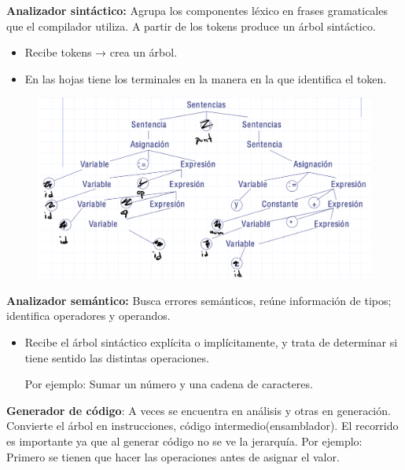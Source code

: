\documentclass[12pt]{report} %
\begin{document}
\textbf{Analizador sintáctico:} Agrupa los componentes léxico en frases
gramaticales que el compilador utiliza. A partir de los tokens produce
un árbol sintáctico.

\begin{itemize}
\item
  Recibe tokens → crea un árbol.
\item
  En las hojas tiene los terminales en la manera en la que identifica el
  token.
\end{itemize}

\begin{figure}[H]
	{\includegraphics[scale=.25]{Untitled 13.png}}
\end{figure}

\textbf{Analizador semántico:} Busca errores semánticos, reúne
información de tipos; identifica operadores y operandos.

\begin{itemize}
\item
  Recibe el árbol sintáctico explícita o implícitamente, y trata de
  determinar si tiene sentido las distintas operaciones.

  Por ejemplo: Sumar un número y una cadena de caracteres.
\end{itemize}

\textbf{Generador de código}: A veces se encuentra en análisis y otras
en generación. Convierte el árbol en instrucciones, código
intermedio(ensamblador). El recorrido es importante ya que al generar
código no se ve la jerarquía. Por ejemplo: Primero se tienen que hacer
las operaciones antes de asignar el valor.
\end{document}
